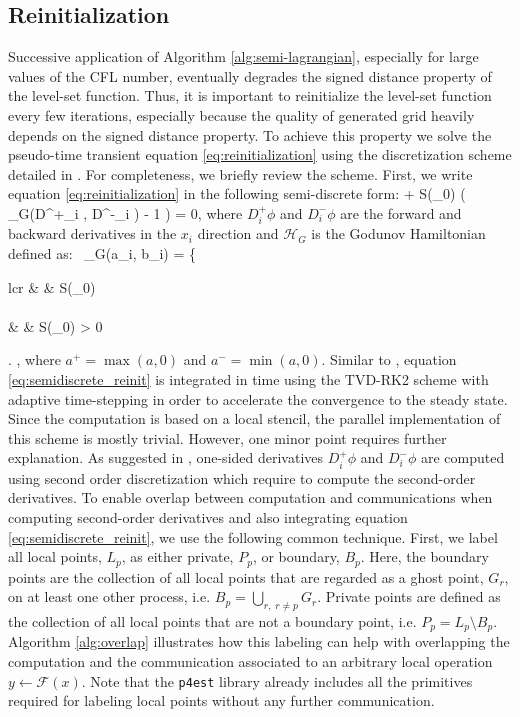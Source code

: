 \subsection{Reinitialization}
Successive application of Algorithm \ref{alg:semi-lagrangian}, especially for large values of the CFL number, eventually degrades the signed distance property of the level-set function. Thus, it is important to reinitialize the level-set function every few iterations, especially because the quality of generated grid heavily depends on the signed distance property. To achieve this property we solve the pseudo-time transient equation \eqref{eq:reinitialization} using the discretization scheme detailed in \cite{Min;Gibou:07:A-second-order-accur}. For completeness, we briefly review the scheme. First, we write equation \eqref{eq:reinitialization} in the following semi-discrete form:
\be
{} + S(\phi_0) \left( _G(D^+_i \phi, D^-_i \phi) - 1 \right) = 0,
\label{eq:semidiscrete_reinit}
\ee
where $D^+_i \phi$ and $D^-_i \phi$ are the forward and backward derivatives in the $x_i$ direction and $\mathcal{H}_G$ is the Godunov Hamiltonian defined as:\
\ben
{}_G(a_i, b_i) = 
\left\{
\begin{array}{lcr}
	 & \hspace {5 mm}  & S(\phi_0)  \\
	\\
	 & \hspace {5 mm}  & S(\phi_0)  >  0 
\end{array}
\right.
,
\een
where $a^+ = \max(a, 0)$ and $a^- = \min(a, 0)$. Similar to \cite{Min;Gibou:07:A-second-order-accur}, equation \eqref{eq:semidiscrete_reinit} is integrated in time using the TVD-RK2 scheme with adaptive time-stepping in order to accelerate the convergence to the steady state. Since the computation is based on a local stencil, the parallel implementation of this scheme is mostly trivial. However, one minor point requires further explanation. As suggested in \cite{Min;Gibou:07:A-second-order-accur}, one-sided derivatives $D^+_i \phi$ and $D^-_i \phi$ are computed using second order discretization which require to compute the second-order derivatives. To enable overlap between computation and communications when computing second-order derivatives and also integrating equation \eqref{eq:semidiscrete_reinit}, we use the following common technique. First, we label all local points, $L_p$, as either private, $P_p$, or boundary, $B_p$. Here, the boundary points are the collection of all local points that are regarded as a ghost point, $G_r$, on at least one other process, i.e. $B_p = \underset{r,\;r\neq p}{\bigcup} G_r$. Private points are defined as the collection of all local points that are not a boundary point, i.e. $P_p = L_p \setminus B_p$. Algorithm \ref{alg:overlap} illustrates how this labeling can help with overlapping the computation and the communication associated to an arbitrary local operation $y \gets \mathcal{F}(x)$. Note that the \texttt{p4est} library already includes all the primitives required for labeling local points without any further communication.

